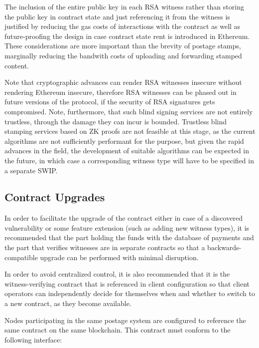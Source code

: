 The inclusion of the entire public key in each RSA witness rather than storing the public key in contract state and just referencing it from the witness is justified by reducing the gas costs of interactions with the contract as well as future-proofing the design in case contract state rent is introduced in Ethereum. These considerations are more important than the brevity of postage stamps, marginally reducing the bandwith costs of uploading and forwarding stamped content.

Note that cryptographic advances can render RSA witnesses insecure without rendering Ethereum insecure, therefore RSA witnesses can be phased out in future versions of the protocol, if the security of RSA signatures gets compromised. Note, furthermore, that such blind signing services are not entirely trustless, through the damage they can incur is bounded. Trustless blind stamping services based on ZK proofs are not feasible at this stage, as the current algorithms are not sufficiently performant for the purpose, but given the rapid advances in the field, the development of suitable algorithms can be expected in the future, in which case a corresponding witness type will have to be specified in a separate SWIP.

\subsection{Contract Upgrades}

In order to facilitate the upgrade of the contract either in case of a discovered vulnerability or some feature extension (such as adding new witness types), it is recommended that the part holding the funds with the database of payments and the part that verifies witnesses are in separate contracts so that a backwards-compatible upgrade can be performed with minimal disruption.

In order to avoid centralized control, it is also recommended that it is the witness-verifying contract that is referenced in client configuration so that client operators can independently decide for themselves when and whether to switch to a new contract, as they become available.


Nodes participating in the same postage system are configured to reference the same contract on the same blockchain. This contract must conform to the following interface:

\begin{definition}\label{def:postage}

\end{definition}


